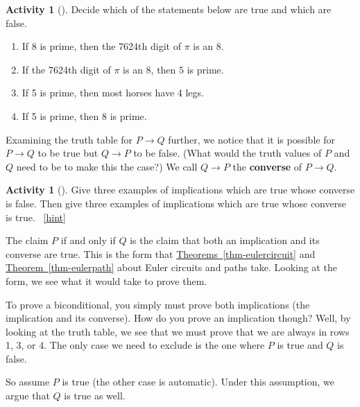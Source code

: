 \documentclass[10pt,]{book}
\newcommand{\terminology}[1]{\textbf{#1}}
\theoremstyle{plain}
\theoremstyle{definition}
\theoremstyle{definition}
\theoremstyle{definition}
\newtheorem{activity}[project]{Activity}
\numberwithin{equation}{chapter}
\def\imp{\rightarrow}
\begin{document}
\begin{activity}[]\label{activity-7}
\hypertarget{p-161}{}%
Decide which of the statements below are true and which are false.%
\begin{enumerate}[font=\bfseries,label=(\alph*),ref=\alph*]
\item\label{task-9} \hypertarget{p-162}{}%
If 8 is prime, then the 7624th digit of \(\pi\) is an 8.%
\item\label{task-10} \hypertarget{p-163}{}%
If the 7624th digit of \(\pi\) is an 8, then \(5\) is prime.%
\item\label{task-11} \hypertarget{p-164}{}%
If 5 is prime, then most horses have 4 legs.%
\item\label{task-12} \hypertarget{p-165}{}%
If 5 is prime, then 8 is prime.%
\end{enumerate}
\end{activity}
\hypertarget{p-166}{}%
Examining the truth table for \(P \imp Q\) further, we notice that it is possible for \(P \imp Q\) to be true but \(Q \imp P\) to be false. (What would the truth values of \(P\) and \(Q\) need to be to make this the case?) We call \(Q \imp P\) the \terminology{converse} of \(P \imp Q\).%
\begin{activity}[]\label{activity-8}
\hypertarget{p-167}{}%
Give three examples of implications which are true whose converse is false.  Then give three examples of implications which are true whose converse is true.%
~\hfill{\tiny\hyperlink{a-13}{[hint]}\hypertarget{q-13}{}}\end{activity}
\hypertarget{p-169}{}%
The claim \(P\) if and only if \(Q\) is the claim that both an implication and its converse are true.  This is the form that \hyperref[thm-eulercircuit]{Theorems~\ref{thm-eulercircuit}} and \hyperref[thm-eulerpath]{Theorem~\ref{thm-eulerpath}} about Euler circuits and paths take.  Looking at the form, we see what it would take to prove them.%
\par
\hypertarget{p-170}{}%
To prove a biconditional, you simply must prove both implications (the implication and its converse).  How do you prove an implication though?  Well, by looking at the truth table, we see that we must prove that we are always in rows 1, 3, or 4.  The only case we need to exclude is the one where \(P\) is true and \(Q\) is false.%
\par
\hypertarget{p-171}{}%
So assume \(P\) is true (the other case is automatic).  Under this assumption, we argue that \(Q\) is true as well.%
\par
\hypertarget{p-172}{}%
\end{document}
